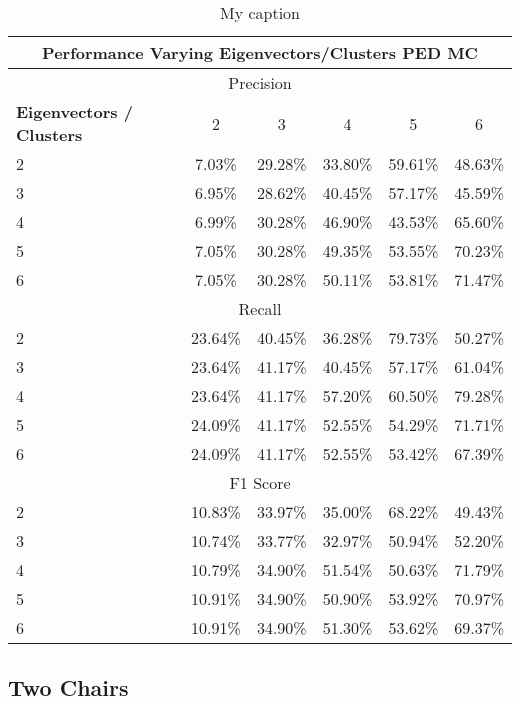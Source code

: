 %
\begin{table}[H]
\centering
\begin{tabular}{|l|c|c|c|c|c|}
\hline
\multicolumn{6}{|c|}{Performance Varying Eigenvectors/Clusters PED MC} \\ \hline
\multicolumn{6}{|c|}{Precision} \\ \hline
\textbf{Eigenvectors / Clusters} & 2 & 3 & 4 & 5 & 6 \\ \hline
2 & 7.03\% & 29.28\% & 33.80\% & 59.61\% & 48.63\%  \\ \hline
3 & 6.95\% & 28.62\% & 40.45\% & 57.17\% & 45.59\%  \\ \hline
4 & 6.99\% & 30.28\% & 46.90\% & 43.53\% & 65.60\%  \\ \hline
5 & 7.05\% & 30.28\% & 49.35\% & 53.55\% & 70.23\%  \\ \hline
6 & 7.05\% & 30.28\% & 50.11\% & 53.81\% & 71.47\%  \\ \hline
\multicolumn{6}{|c|}{Recall} \\ \hline
2 & 23.64\% & 40.45\% & 36.28\% & 79.73\% & 50.27\%  \\ \hline
3 & 23.64\% & 41.17\% & 40.45\% & 57.17\% & 61.04\%  \\ \hline
4 & 23.64\% & 41.17\% & 57.20\% & 60.50\% & 79.28\%  \\ \hline
5 & 24.09\% & 41.17\% & 52.55\% & 54.29\% & 71.71\%  \\ \hline
6 & 24.09\% & 41.17\% & 52.55\% & 53.42\% & 67.39\%  \\ \hline
\multicolumn{6}{|c|}{F1 Score} \\ \hline
2 & 10.83\% & 33.97\% & 35.00\% & 68.22\% & 49.43\%  \\ \hline
3 & 10.74\% & 33.77\% & 32.97\% & 50.94\% & 52.20\%  \\ \hline
4 & 10.79\% & 34.90\% & 51.54\% & 50.63\% & 71.79\%  \\ \hline
5 & 10.91\% & 34.90\% & 50.90\% & 53.92\% & 70.97\%  \\ \hline
6 & 10.91\% & 34.90\% & 51.30\% & 53.62\% & 69.37\%  \\ \hline
\end{tabular}
\caption[Performance Varying Eigenvector-Cluster]{My caption}
\label{tab:ev_c}
\end{table}




\subsection{Two Chairs}

